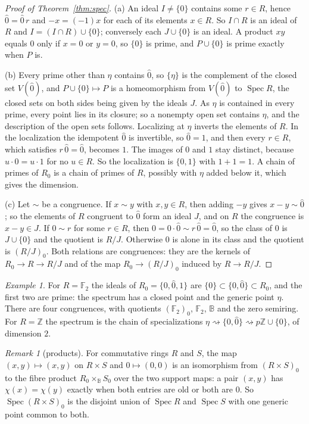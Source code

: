 \documentclass[11pt]{amsart}
\theoremstyle{remark}
\newtheorem{remark}[thm]{Remark}
\newtheorem{example}[thm]{Example}
\newcommand{\B}{\mathbb B}
\newcommand{\oz}{\widehat{0}}
\DeclareMathOperator{\Spec}{Spec}
\begin{document}
\begin{proof}[Proof of Theorem~\ref{thm:spec}]
(a) An ideal $I\ne\{0\}$ contains some $r\in R$, hence $\oz=\oz\,r$ and $-x=(-1)x$ for each of its elements $x\in R$. So $I\cap R$ is an ideal of $R$ and $I=(I\cap R)\cup\{0\}$; conversely each $J\cup\{0\}$ is an ideal. A product $xy$ equals $0$ only if $x=0$ or $y=0$, so $\{0\}$ is prime, and $P\cup\{0\}$ is prime exactly when $P$ is.

(b) Every prime other than $\eta$ contains $\oz$, so $\{\eta\}$ is the complement of the closed set $V(\oz)$, and $P\cup\{0\}\mapsto P$ is a homeomorphism from $V(\oz)$ to $\Spec R$, the closed sets on both sides being given by the ideals $J$. As $\eta$ is contained in every prime, every point lies in its closure; so a nonempty open set contains $\eta$, and the description of the open sets follows. Localizing at $\eta$ inverts the elements of $R$. In the localization the idempotent $\oz$ is invertible, so $\oz=1$, and then every $r\in R$, which satisfies $r\,\oz=\oz$, becomes $1$. The images of $0$ and $1$ stay distinct, because $u\cdot0=u\cdot1$ for no $u\in R$. So the localization is $\{0,1\}$ with $1+1=1$. A chain of primes of $R_0$ is a chain of primes of $R$, possibly with $\eta$ added below it, which gives the dimension.

(c) Let $\sim$ be a congruence. If $x\sim y$ with $x,y\in R$, then adding $-y$ gives $x-y\sim\oz$; so the elements of $R$ congruent to $\oz$ form an ideal $J$, and on $R$ the congruence is $x-y\in J$. If $0\sim r$ for some $r\in R$, then $0=0\cdot\oz\sim r\,\oz=\oz$, so the class of $0$ is $J\cup\{0\}$ and the quotient is $R/J$. Otherwise $0$ is alone in its class and the quotient is $(R/J)_0$. Both relations are congruences: they are the kernels of $R_0\to R\to R/J$ and of the map $R_0\to(R/J)_0$ induced by $R\to R/J$.
\end{proof}

\begin{example}
For $R=\mathbb F_2$ the ideals of $R_0=\{0,\oz,1\}$ are $\{0\}\subset\{0,\oz\}\subset R_0$, and the first two are prime: the spectrum has a closed point and the generic point $\eta$. There are four congruences, with quotients $(\mathbb F_2)_0$, $\mathbb F_2$, $\B$ and the zero semiring. For $R=\mathbb Z$ the spectrum is the chain of specializations $\eta\rightsquigarrow\{0,\oz\}\rightsquigarrow p\mathbb Z\cup\{0\}$, of dimension $2$.
\end{example}

\begin{remark}[products]\label{rem:product}
For commutative rings $R$ and $S$, the map $(x,y)\mapsto(x,y)$ on $R\times S$ and $0\mapsto(0,0)$ is an isomorphism from $(R\times S)_0$ to the fibre product $R_0\times_\B S_0$ over the two support maps: a pair $(x,y)$ has $\chi(x)=\chi(y)$ exactly when both entries are old or both are $0$. So $\Spec(R\times S)_0$ is the disjoint union of $\Spec R$ and $\Spec S$ with one generic point common to both.
\end{remark}
\end{document}
